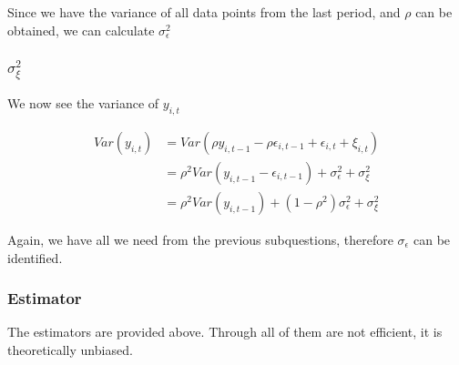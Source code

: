 Since we have the variance of all data points from the last period, 
and $\rho$ can be obtained, we can calculate $\sigma_\epsilon^2$

\subsubsection{$\sigma_\xi^2$}

We now see the variance of $y_{i,t}$

\begin{align*}
    Var(y_{i,t}) &= Var(\rho y_{i,t-1} - \rho \epsilon_{i,t-1} + \epsilon_{i,t} + \xi_{i,t}) \\
    &= \rho^2 Var(y_{i,t-1} - \epsilon_{i,t-1}) + \sigma_\epsilon^2 + \sigma_\xi^2 \\
    &= \rho^2 Var(y_{i,t-1}) + (1-\rho^2)\sigma_\epsilon^2 + \sigma_\xi^2
\end{align*}

Again, we have all we need from the previous subquestions, therefore $\sigma_\epsilon$ can be identified.

\subsubsection{Estimator}

The estimators are provided above. Through all of them are not efficient, 
it is theoretically unbiased. 